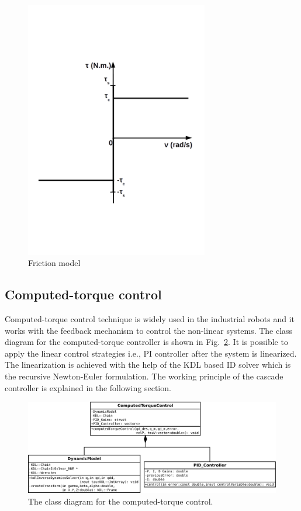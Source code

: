 \begin{figure}[h]
\centering
\includegraphics[width=80mm, trim=0 180 0 220]{pictures/friction_staticandcoulomb}
\caption{Friction model}
\label{fig:frictionmodel}
\end{figure}

\newpage
\subsection{Computed-torque control}

Computed-torque control technique is widely used in the industrial robots and it works with the feedback mechanism to control the non-linear systems. The class diagram for the computed-torque controller is shown in Fig.~\ref{fig:classdiagram_computedtorquecontrol}. It is possible to apply the linear control strategies i.e., PI controller after the system is linearized. The linearization is achieved with the help of the KDL based ID solver which is the recursive Newton-Euler formulation. The working principle of the cascade controller is explained in the following section.

\begin{figure}[h]
\centering
\includegraphics[width=150mm]{pictures/class_diagram_computedtorquecontrol.pdf}
\caption{The class diagram for the computed-torque control.}
\label{fig:classdiagram_computedtorquecontrol}
\end{figure}

